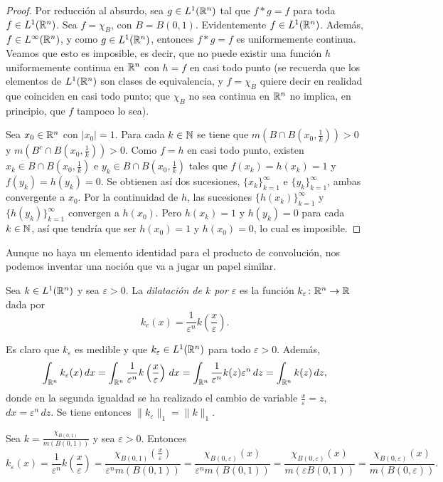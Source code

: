 \documentclass[a4paper, 11pt, oneside]{report}
\begin{document}
\begin{proof}
Por reducción al absurdo, sea $g \in L^1(\mathbb R^n)$ tal que $f \ast g = f$ para toda $f \in L^1(\mathbb R^n)$. Sea $f = \chi_B$, con $B=B(0,1)$. Evidentemente $f\in L^1(\mathbb R^n)$. Además, $f\in L^{\infty}(\mathbb R^n)$, y como $g \in L^1(\mathbb R^n)$, entonces $f \ast g = f$ es uniformemente continua. Veamos que esto es imposible, es decir, que no puede existir una función $h$ uniformemente continua en $\mathbb R^n$ con $h = f$ en casi todo punto (se recuerda que los elementos de $L^1(\mathbb R^n)$ son clases de equivalencia, y $f = \chi_B$ quiere decir en realidad que coinciden en casi todo punto; que $\chi_B$ no sea continua en $\mathbb R^n$ no implica, en principio, que $f$ tampoco lo sea). 

Sea $x_0 \in \mathbb R^n$ con $|x_0|=1$. Para cada $k \in \mathbb N$ se tiene que $m(B \cap B(x_0,\frac{1}{k}))>0$ y $m(B^c \cap B(x_0,\frac{1}{k}))>0$. Como $f = h$ en casi todo punto, existen $x_k \in B\cap B(x_0,\frac{1}{k})$ e $y_k \in B\cap B(x_0,\frac{1}{k})$ tales que $f(x_k) = h(x_k) = 1$ y $f(y_k) = h(y_k) = 0$. Se obtienen así dos sucesiones, $\{x_k\}_{k=1}^\infty$ e $\{y_k\}_{k=1}^\infty$, ambas convergente a $x_0$. Por la continuidad de $h$, las sucesiones $\{h(x_k)\}_{k=1}^\infty$ y $\{h(y_k)\}_{k=1}^\infty$ convergen a $h(x_0)$. Pero $h(x_k) = 1$ y $h(y_k) = 0$ para cada $k \in \mathbb N$, así que tendría que ser $h(x_0) = 1$ y $h(x_0) = 0$, lo cual es imposible.
\end{proof}

Aunque no haya un elemento identidad para el producto de convolución, nos podemos inventar una noción que va a jugar un papel similar. 

\begin{definition}
  Sea $k \in L^1(\mathbb R^n)$ y sea $\varepsilon>0$. La \emph{dilatación de $k$ por $\varepsilon$} es la función $k_\varepsilon \colon \mathbb R^n \to \mathbb R$ dada por
  \[k_e(x)=\frac{1}{\varepsilon^n}k\left(\frac{x}{\varepsilon}\right).\]
\end{definition}

Es claro que $k_\varepsilon$ es medible y que $k_\varepsilon \in L^1(\mathbb R^n)$ para todo $\varepsilon >0$. Además,
\[\int_{\mathbb R^n} k_\varepsilon(x) \, dx = \int_{\mathbb R^n} \frac{1}{\varepsilon^n}k\left(\frac{x}{\varepsilon}\right) \, dx = \int_{\mathbb R^n}\frac{1}{\varepsilon^n}k(z)\varepsilon^n \, dz = \int_{\mathbb R^n} k(z) \, dz,\]
donde en la segunda igualdad se ha realizado el cambio de variable $\frac{x}{\varepsilon} = z$, $dx = \varepsilon^n \, dz$. Se tiene entonces $\|k_\varepsilon\|_1 = \|k\|_1$.

\begin{example}
  Sea $k = \frac{\chi_{B(0,1)}}{m(B(0,1))}$ y sea $\varepsilon > 0$. Entonces
  \[k_\varepsilon(x)=\frac{1}{\varepsilon^n}k\left(\frac{x}{\varepsilon}\right) = \frac{\chi_{B(0,1)}(\frac{x}{\varepsilon})}{\varepsilon^n m(B(0,1))} = \frac{\chi_{B(0,\varepsilon)}(x)}{\varepsilon^nm(B(0,1))} = \frac{\chi_{B(0,\varepsilon)}(x)}{m(\varepsilon B(0,1))} = \frac{\chi_{B(0,\varepsilon)}(x)}{m(B(0,\varepsilon))}.\]
\end{example}
\end{document}
